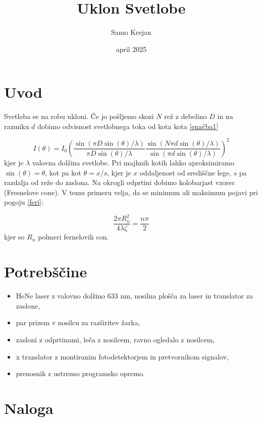 \documentclass[12pt]{article}
\title{\textbf{Uklon Svetlobe}}
\author{Samo Krejan}
\date{april 2025}
\begin{document}
\maketitle

\section{Uvod}

Svetloba se na robu ukloni. Če jo pošljemo skozi $N$ rež z debelino $D$ in na razmiku $d$ dobimo odvisnost svetlobnega toka od kota kota \ref{enačba1}

\begin{equation}
    I(\theta) = I_0 \left( \frac{\sin(\pi D \sin(\theta)/\lambda)}{\pi D \sin(\theta)/\lambda}\frac{\sin(N\pi d \sin(\theta)/\lambda)}{\sin(\pi d \sin(\theta)/\lambda)} \right)^2
    \label{enačba1}
\end{equation}
kjer je $\lambda$ valovna dolžina svetlobe. Pri majhnih kotih lahko aproksimiramo $\sin(\theta) = \theta$, kot pa kot $\theta = x/s$, kjer je $x$ oddaljenost od središčne lege, $s$ pa razdalja od reže do zaslona. Na okrogli odprtini dobimo kolobarjast vzorec (Fresnelove cone). V temu primeru velja, da se minimum ali maksimum pojavi pri pogoju \ref{feri}:

\begin{equation}
    \frac{2\pi R_n^2}{4\lambda\zeta}=\frac{n\pi}{2}
    \label{feri}
\end{equation}
kjer so $R_n$ polmeri fernelovih con.


\section{Potrebščine}
\begin{itemize}
    \item HeNe laser z valovno dolžino 633 nm, nosilna plošča za laser in translator za zaslone,
    \item par prizem v nosilcu za razširitev žarka,
    \item zasloni z odprtinami, leča z nosilcem, ravno ogledalo z nosilcem,
    \item x translator z montiranim fotodetektorjem in pretvornikom signalov,
    \item prenosnik z ustrezno programsko opremo.
\end{itemize}


\section{Naloga}
\end{document}
